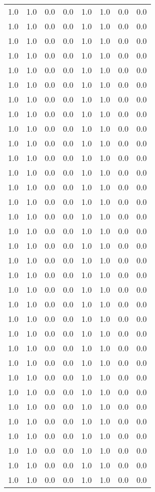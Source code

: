 \begin{tabular}{L{1in}|L{1in}|L{1in}|L{1in}|L{1in}|L{1in}|L{1in}|L{1in}}
1.0&1.0&0.0&0.0&1.0&1.0&0.0&0.0\\
1.0&1.0&0.0&0.0&1.0&1.0&0.0&0.0\\
1.0&1.0&0.0&0.0&1.0&1.0&0.0&0.0\\
1.0&1.0&0.0&0.0&1.0&1.0&0.0&0.0\\
1.0&1.0&0.0&0.0&1.0&1.0&0.0&0.0\\
1.0&1.0&0.0&0.0&1.0&1.0&0.0&0.0\\
1.0&1.0&0.0&0.0&1.0&1.0&0.0&0.0\\
1.0&1.0&0.0&0.0&1.0&1.0&0.0&0.0\\
1.0&1.0&0.0&0.0&1.0&1.0&0.0&0.0\\
1.0&1.0&0.0&0.0&1.0&1.0&0.0&0.0\\
1.0&1.0&0.0&0.0&1.0&1.0&0.0&0.0\\
1.0&1.0&0.0&0.0&1.0&1.0&0.0&0.0\\
1.0&1.0&0.0&0.0&1.0&1.0&0.0&0.0\\
1.0&1.0&0.0&0.0&1.0&1.0&0.0&0.0\\
1.0&1.0&0.0&0.0&1.0&1.0&0.0&0.0\\
1.0&1.0&0.0&0.0&1.0&1.0&0.0&0.0\\
1.0&1.0&0.0&0.0&1.0&1.0&0.0&0.0\\
1.0&1.0&0.0&0.0&1.0&1.0&0.0&0.0\\
1.0&1.0&0.0&0.0&1.0&1.0&0.0&0.0\\
1.0&1.0&0.0&0.0&1.0&1.0&0.0&0.0\\
1.0&1.0&0.0&0.0&1.0&1.0&0.0&0.0\\
1.0&1.0&0.0&0.0&1.0&1.0&0.0&0.0\\
1.0&1.0&0.0&0.0&1.0&1.0&0.0&0.0\\
1.0&1.0&0.0&0.0&1.0&1.0&0.0&0.0\\
1.0&1.0&0.0&0.0&1.0&1.0&0.0&0.0\\
1.0&1.0&0.0&0.0&1.0&1.0&0.0&0.0\\
1.0&1.0&0.0&0.0&1.0&1.0&0.0&0.0\\
1.0&1.0&0.0&0.0&1.0&1.0&0.0&0.0\\
1.0&1.0&0.0&0.0&1.0&1.0&0.0&0.0\\
1.0&1.0&0.0&0.0&1.0&1.0&0.0&0.0\\
1.0&1.0&0.0&0.0&1.0&1.0&0.0&0.0\\
1.0&1.0&0.0&0.0&1.0&1.0&0.0&0.0\\
1.0&1.0&0.0&0.0&1.0&1.0&0.0&0.0\\
\hline\end{tabular}
